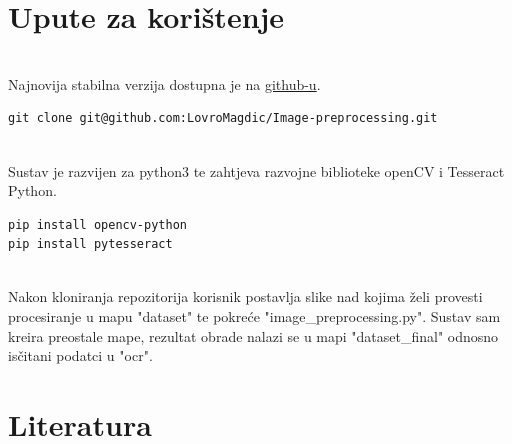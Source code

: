 \documentclass{article}
\begin{document}
\section{Upute za korištenje}
\\
Najnovija stabilna verzija dostupna je na \href{https://github.com/LovroMagdic/Image-preprocessing}{github-u}.
\begin{lstlisting}
git clone git@github.com:LovroMagdic/Image-preprocessing.git
\end{lstlisting}
\\
Sustav je razvijen za python3 te zahtjeva razvojne biblioteke openCV i Tesseract Python.
\begin{lstlisting}
pip install opencv-python
pip install pytesseract
\end{lstlisting}
\\
Nakon kloniranja repozitorija korisnik postavlja slike nad kojima želi provesti procesiranje u mapu "dataset" te pokreće "image\_preprocessing.py". Sustav sam kreira preostale mape, rezultat obrade nalazi se u mapi "dataset\_final" odnosno isčitani podatci u "ocr". 
\newpage
\section{Literatura}
\end{document}
